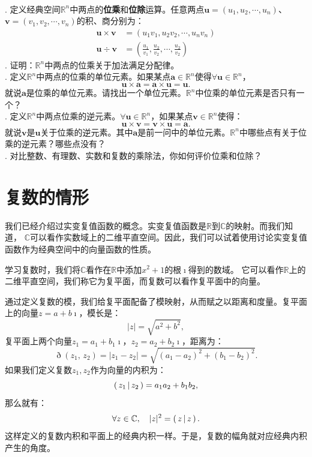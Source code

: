 \documentclass[12pt,UTF8,fontset=none]{ctexbook}
\begin{document}
\begin{xt}
    \mbox{} \\
    . 定义经典空间$\mathbb{R}^n$中两点的\textbf{位乘}和\textbf{位除}运算。任意两点$\mathbf{u} = (u_1, u_2, \cdots, u_n)$、$\mathbf{v} = (v_1, v_2, \cdots, v_n)$的积、商分别为：
    \begin{align*}
        \mathbf{u} \times \mathbf{v} &= (u_1 v_1, u_2 v_2, \cdots, u_n v_n) \\
        \mathbf{u} \div \mathbf{v} &= \left(\frac{u_1}{v_1}, \frac{u_2}{v_2}, \cdots, \frac{u_2}{v_2}\right)
    \end{align*}
    . 证明：$\mathbb{R}^n$中两点的位乘关于加法满足分配律。\\
    . 定义$\mathbb{R}^n$中两点的位乘的单位元素。如果某点$\mathbf{a}\in\mathbb{R}^n$使得$\forall \mathbf{u}\in\mathbb{R}^n$，
    $$\mathbf{u}\times \mathbf{a} = \mathbf{a}\times \mathbf{u} = \mathbf{u}.  $$
    就说$\mathbf{a}$是位乘的单位元素。请找出一个单位元素。$\mathbb{R}^n$中位乘的单位元素是否只有一个？\\
    . 定义$\mathbb{R}^n$中两点位乘的逆元素。$\forall \mathbf{u}\in\mathbb{R}^n$，如果某点$\mathbf{v}\in\mathbb{R}^n$使得：
    $$\mathbf{u}\times \mathbf{v} = \mathbf{v}\times \mathbf{u} = \mathbf{a}.  $$
    就说$\mathbf{v}$是$\mathbf{u}$关于位乘的逆元素。其中$\mathbf{a}$是前一问中的单位元素。$\mathbb{R}^n$中哪些点有关于位乘的逆元素？哪些点没有？\\
    . 对比整数、有理数、实数和复数的乘除法，你如何评价位乘和位除？
\end{xt}

\section{复数的情形}

我们已经介绍过实变复值函数的概念。实变复值函数是$\mathbb{R}$到$\mathbb{C}$的映射。而我们知道，
$\mathbb{C}$可以看作实数域上的二维平直空间。因此，我们可以试着使用讨论实变复值函数作为经典空间中的向量函数的性质。

学习复数时，我们将$\mathbb{C}$看作在$\mathbb{R}$中添加$x^2 + 1$的根$\imath$得到的数域。
它可以看作$\mathbb{R}$上的二维平直空间，我们称它为复平面，而复数可以看作复平面中的向量。

通过定义复数的模，我们给复平面配备了模映射，从而赋之以距离和度量。复平面上的向量$z = a + b\imath$，模长是：
$$ |z| = \sqrt{a^2 + b^2},$$
复平面上两个向量$z_1 = a_1 + b_1\imath$，$z_2 = a_2 + b_2\imath$，距离为：
$$ \eth(z_1,\, z_2) = |z_1 - z_2| = \sqrt{(a_1 - a_2)^2 + (b_1 - b_2)^2}. $$
如果我们定义复数$z_1, z_2$作为向量的内积为：
$$ \displaystyle\left( \,z_1 \,\middle\vert \,z_2 \,\right) = a_1a_2 + b_1b_2,$$
那么就有：
$$ \forall z \in \mathbb{C}, \quad |z|^2 = \displaystyle\left( \,z \,\middle\vert \,z \,\right). $$
这样定义的复数内积和平面上的经典内积一样。于是，复数的幅角就对应经典内积产生的角度。
\end{document}
